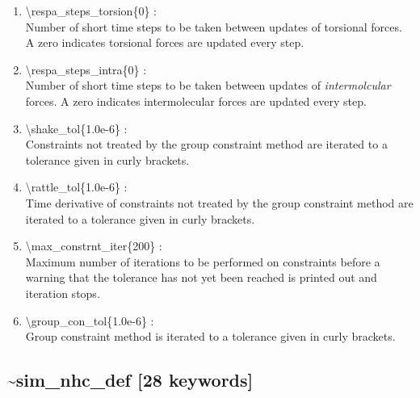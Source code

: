 \documentclass[12pt,titlepage]{article}
\begin{document}
\begin{enumerate}
 \vspace{0.15in} 
 \item   \textbackslash{}respa\_steps\_torsion\{0\} : \\
    Number of short time steps to be taken between updates of torsional
    forces.  A zero indicates torsional forces are updated every step.

 \vspace{0.15in} 
  \item   \textbackslash{}respa\_steps\_intra\{0\} : \\
    Number of short time steps to be taken between updates of 
    {\it intermolcular} forces.  A zero indicates intermolecular forces are 
    updated every step.

 \vspace{0.15in} 
 \item   \textbackslash{}shake\_tol\{1.0e-6\} : \\
     Constraints not treated by the group constraint method are iterated to a
     tolerance given in curly brackets.


 \vspace{0.15in} 
 \item   \textbackslash{}rattle\_tol\{1.0e-6\} : \\
      Time derivative of constraints not treated by the group constraint 
      method are iterated to a tolerance given in curly brackets.


 \vspace{0.15in} 
 \item   \textbackslash{}max\_constrnt\_iter\{200\} : \\
     Maximum number of iterations to be performed on constraints before a 
     warning that the tolerance has not yet been reached is printed out and 
     iteration stops.

 \vspace{0.15in} 
 \item   \textbackslash{}group\_con\_tol\{1.0e-6\} : \\
     Group constraint method is iterated to a tolerance given in curly 
     brackets.

\end{enumerate}

\newpage
\subsection*{\bf \~{}sim\_nhc\_def [28 keywords]}
\end{document}
